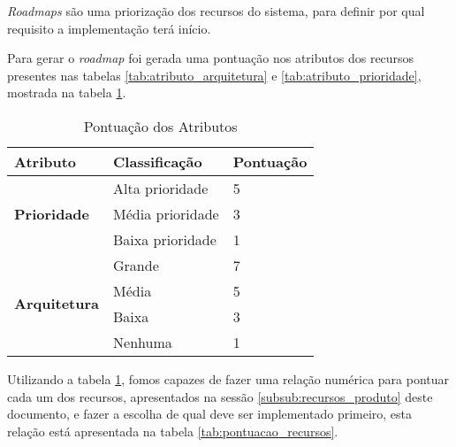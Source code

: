 
\textit{Roadmaps} são uma priorização dos recursos do sistema, para definir por qual requisito a implementação terá início.

Para gerar o \textit{roadmap} foi gerada uma pontuação nos atributos dos recursos presentes nas tabelas \ref{tab:atributo_arquitetura} e \ref{tab:atributo_prioridade}, mostrada na tabela \ref{tab:pontuacao_atributos}.

\begin{table}[H]
\centering
\begin{tabular}{|p{2cm}|p{5cm}|p{3cm}|}

\hline
\textbf{Atributo} &
\textbf{Classificação} &
\textbf{Pontuação}
\\ \hline

\multirow{3}{*}{
\textbf{Prioridade}} &
	Alta prioridade &
	5
	\\ \cline{2-3} &
	Média prioridade  &
	3
	\\ \cline{2-3} &
	Baixa prioridade  &
	1
	\\ \hline

\multirow{4}{*}{\textbf{Arquitetura}} &
	Grande &
	7
	\\ \cline{2-3} &
	Média &
	5
	\\ \cline{2-3} &
	Baixa &
	3
	\\ \cline{2-3} &
	Nenhuma &
	1
	\\ \hline
\end{tabular}
\caption{Pontuação dos Atributos}
\label{tab:pontuacao_atributos}
\end{table}

Utilizando a tabela \ref{tab:pontuacao_atributos}, fomos capazes de fazer uma relação numérica para pontuar cada um dos recursos, apresentados na sessão \ref{subsub:recursos_produto} deste documento, e fazer a escolha de qual deve ser implementado primeiro, esta relação está apresentada na tabela \ref{tab:pontuacao_recursos}.

